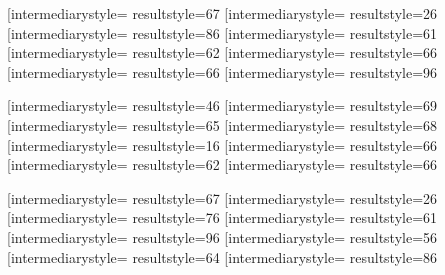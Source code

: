 \documentclass[letterpaper, 17pt]{article}
\newcommand{\white}[1]{}
\begin{document}
\begin{center}
	\vspace{0.3in}

	\opmul[intermediarystyle=\white, resultstyle=\white]{6}{7}\qquad
	\opmul[intermediarystyle=\white, resultstyle=\white]{2}{6}\qquad
	\opmul[intermediarystyle=\white, resultstyle=\white]{8}{6}\qquad
	\opmul[intermediarystyle=\white, resultstyle=\white]{6}{1}\qquad
	\opmul[intermediarystyle=\white, resultstyle=\white]{6}{2}\qquad
	\opmul[intermediarystyle=\white, resultstyle=\white]{6}{6}\qquad
	\opmul[intermediarystyle=\white, resultstyle=\white]{6}{6}\qquad
	\opmul[intermediarystyle=\white, resultstyle=\white]{9}{6}\qquad

	\vspace{0.3in}

	\opmul[intermediarystyle=\white, resultstyle=\white]{4}{6}\qquad
	\opmul[intermediarystyle=\white, resultstyle=\white]{6}{9}\qquad
	\opmul[intermediarystyle=\white, resultstyle=\white]{6}{5}\qquad
	\opmul[intermediarystyle=\white, resultstyle=\white]{6}{8}\qquad
	\opmul[intermediarystyle=\white, resultstyle=\white]{1}{6}\qquad
	\opmul[intermediarystyle=\white, resultstyle=\white]{6}{6}\qquad
	\opmul[intermediarystyle=\white, resultstyle=\white]{6}{2}\qquad
	\opmul[intermediarystyle=\white, resultstyle=\white]{6}{6}\qquad

	\vspace{0.3in}

	\opmul[intermediarystyle=\white, resultstyle=\white]{6}{7}\qquad
	\opmul[intermediarystyle=\white, resultstyle=\white]{2}{6}\qquad
	\opmul[intermediarystyle=\white, resultstyle=\white]{7}{6}\qquad
	\opmul[intermediarystyle=\white, resultstyle=\white]{6}{1}\qquad
	\opmul[intermediarystyle=\white, resultstyle=\white]{9}{6}\qquad
	\opmul[intermediarystyle=\white, resultstyle=\white]{5}{6}\qquad
	\opmul[intermediarystyle=\white, resultstyle=\white]{6}{4}\qquad
	\opmul[intermediarystyle=\white, resultstyle=\white]{8}{6}\qquad


\end{center}
\end{document}
